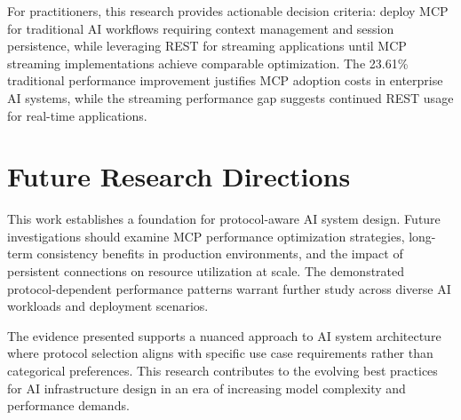 For practitioners, this research provides actionable decision criteria: deploy MCP for traditional AI workflows requiring context management and session persistence, while leveraging REST for streaming applications until MCP streaming implementations achieve comparable optimization. The 23.61\% traditional performance improvement justifies MCP adoption costs in enterprise AI systems, while the streaming performance gap suggests continued REST usage for real-time applications.

\section{Future Research Directions}

This work establishes a foundation for protocol-aware AI system design. Future investigations should examine MCP performance optimization strategies, long-term consistency benefits in production environments, and the impact of persistent connections on resource utilization at scale. The demonstrated protocol-dependent performance patterns warrant further study across diverse AI workloads and deployment scenarios.

The evidence presented supports a nuanced approach to AI system architecture where protocol selection aligns with specific use case requirements rather than categorical preferences. This research contributes to the evolving best practices for AI infrastructure design in an era of increasing model complexity and performance demands.

